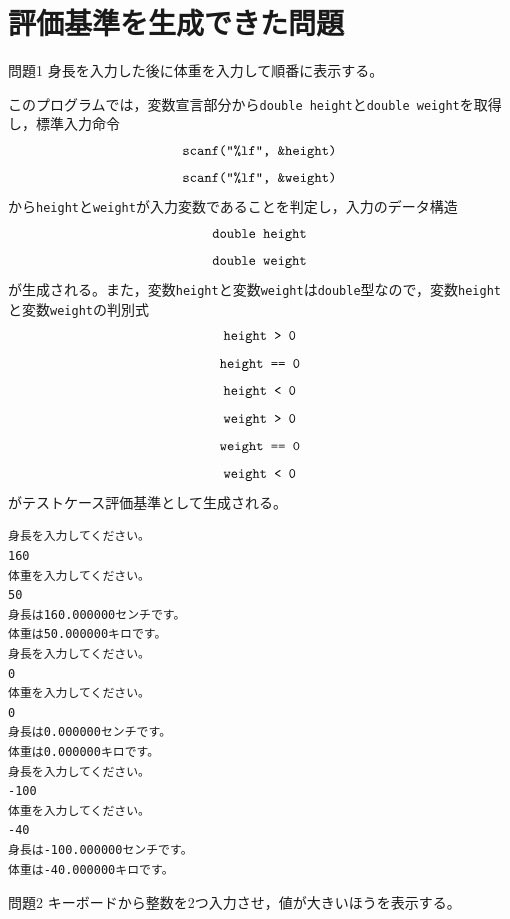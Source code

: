\documentclass{tpu-sotu}
\begin{document}
\section{評価基準を生成できた問題}
\begin{itembox}[l]{問題1}
身長を入力した後に体重を入力して順番に表示する。
\end{itembox}

このプログラムでは，変数宣言部分から{\tt double height}と{\tt double weight}を取得し，標準入力命令\\
\[ 
\mbox{{\tt {scanf("\%lf", \&height)}}}
\]
\[ 
\mbox{{\tt {scanf("\%lf", \&weight)}}}
\]
から{\tt height}と{\tt weight}が入力変数であることを判定し，入力のデータ構造\\
\[
\mbox{{\tt double height}}
\]
\[
\mbox{{\tt double weight}}
\]
が生成される。また，変数{\tt height}と変数{\tt weight}は{\tt double}型なので，変数{\tt height}と変数{\tt weight}の判別式\\
\[ 
\mbox{\tt{height > 0}} 
\]
\[
\mbox{\tt{height == 0}}
\]
\[
\mbox{\tt{height < 0}}
\]
\[ 
\mbox{\tt{weight > 0}} 
\]
\[
\mbox{\tt{weight == 0}}
\]
\[
\mbox{\tt{weight < 0}}
\]
がテストケース評価基準として生成される。

\begin{lstlisting}[xleftmargin=1cm]
身長を入力してください。
160
体重を入力してください。
50
身長は160.000000センチです。
体重は50.000000キロです。
身長を入力してください。
0
体重を入力してください。
0
身長は0.000000センチです。
体重は0.000000キロです。
身長を入力してください。
-100
体重を入力してください。
-40
身長は-100.000000センチです。
体重は-40.000000キロです。
\end{lstlisting}
\begin{itembox}[l]{問題2}
キーボードから整数を2つ入力させ，値が大きいほうを表示する。
\end{itembox}
\end{document}
